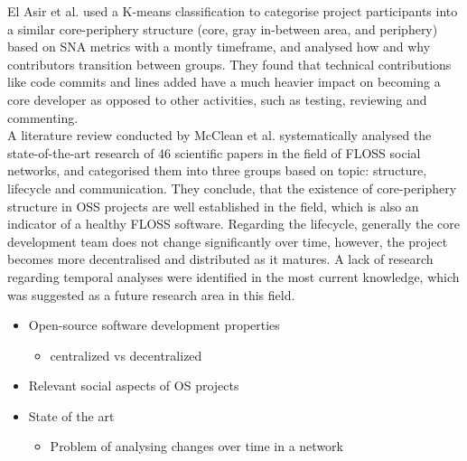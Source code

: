El Asir et al. \cite{elasriPeripheryCoreTemporal2017} used a K-means classification to categorise project participants into a similar core-periphery structure (core, gray in-between area, and periphery) based on SNA metrics with a montly timeframe, and analysed how and why contributors transition between groups. They found that technical contributions like code commits and lines added have a much heavier impact on becoming a core developer as opposed to other activities, such as testing, reviewing and commenting. \\

A literature review conducted by McClean et al. \cite{mccleanSocialNetworkAnalysis2021} systematically analysed the state-of-the-art research of 46 scientific papers in the field of FLOSS social networks, and categorised them into three groups based on topic: structure, lifecycle and communication. They conclude, that the existence of core-periphery structure in OSS projects are well established in the field, which is also an indicator of a healthy FLOSS software. Regarding the lifecycle, generally the core development team does not change significantly over time, however, the project becomes more decentralised and distributed as it matures. A lack of research regarding temporal analyses were identified in the most current knowledge, which was suggested as a future research area in this field.

\begin{itemize}
    \item Open-source software development properties
    \begin{itemize}
        \item centralized vs decentralized

    \end{itemize}
    \item Relevant social aspects of OS projects
    \item State of the art
    \begin{itemize}
        \item Problem of analysing changes over time in a network
    \end{itemize}
\end{itemize}


